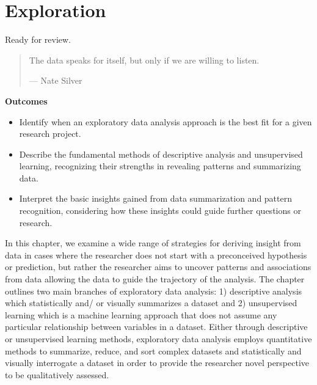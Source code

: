 \documentclass[
  letterpaper,
  DIV=11,
  numbers=noendperiod]{scrreport}
\providecommand{\tightlist}{%
  \setlength{\itemsep}{0pt}\setlength{\parskip}{0pt}}\usepackage{longtable,booktabs,array}
\theoremstyle{definition}
\theoremstyle{remark}
\begin{document}
\hypertarget{sec-exploration}{%
\chapter{Exploration}\label{sec-exploration}}

\begin{tcolorbox}[enhanced jigsaw, coltitle=black, breakable, colbacktitle=quarto-callout-tip-color!10!white, title=\textcolor{quarto-callout-tip-color}{\faLightbulb}\hspace{0.5em}{Draft}, leftrule=.75mm, bottomrule=.15mm, arc=.35mm, left=2mm, colback=white, toptitle=1mm, colframe=quarto-callout-tip-color-frame, bottomtitle=1mm, toprule=.15mm, rightrule=.15mm, titlerule=0mm, opacitybacktitle=0.6, opacityback=0]

Ready for review.

\end{tcolorbox}

\begin{quote}
The data speaks for itself, but only if we are willing to listen.

--- Nate Silver
\end{quote}

\begin{tcolorbox}[enhanced jigsaw, leftrule=.75mm, bottomrule=.15mm, opacityback=0, breakable, left=2mm, colback=white, toprule=.15mm, arc=.35mm, rightrule=.15mm]

\textbf{ Outcomes}

\begin{itemize}
\tightlist
\item
  Identify when an exploratory data analysis approach is the best fit
  for a given research project.
\item
  Describe the fundamental methods of descriptive analysis and
  unsupervised learning, recognizing their strengths in revealing
  patterns and summarizing data.
\item
  Interpret the basic insights gained from data summarization and
  pattern recognition, considering how these insights could guide
  further questions or research.
\end{itemize}

\end{tcolorbox}

In this chapter, we examine a wide range of strategies for deriving
insight from data in cases where the researcher does not start with a
preconceived hypothesis or prediction, but rather the researcher aims to
uncover patterns and associations from data allowing the data to guide
the trajectory of the analysis. The chapter outlines two main branches
of exploratory data analysis: 1) descriptive analysis which
statistically and/ or visually summarizes a dataset and 2) unsupervised
learning which is a machine learning approach that does not assume any
particular relationship between variables in a dataset. Either through
descriptive or unsupervised learning methods, exploratory data analysis
employs quantitative methods to summarize, reduce, and sort complex
datasets and statistically and visually interrogate a dataset in order
to provide the researcher novel perspective to be qualitatively
assessed.
\end{document}
